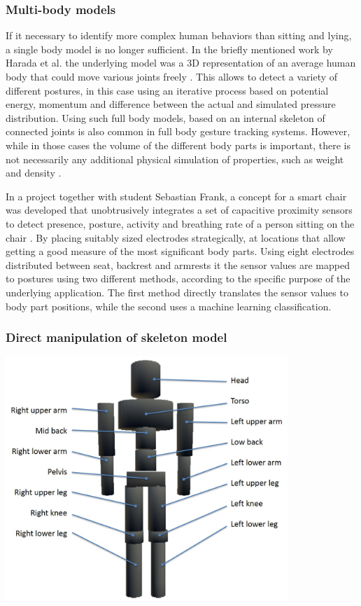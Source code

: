 \subsubsection{Multi-body models}
If it necessary to identify more complex human behaviors than sitting and lying, a single body model is no longer sufficient. In the briefly mentioned work by Harada et al. the underlying model was a 3D representation of an average human body that could move various joints freely \cite{harada2000human}. This allows to detect a variety of different postures, in this case using an iterative process based on potential energy, momentum and difference between the actual and simulated pressure distribution. Using such full body models, based on an internal skeleton of connected joints is also common in full body gesture tracking systems. However, while in those cases the volume of the different body parts is important, there is not necessarily any additional physical simulation of properties, such as weight and density \cite{Shotton2013}. 

In a project together with student Sebastian Frank, a concept for a smart chair was developed that unobtrusively integrates a set of capacitive proximity sensors to detect presence, posture, activity and breathing rate of a person sitting on the chair \cite{Braun2013ChairAid}. By placing suitably sized electrodes strategically, at locations that allow getting a good measure of the most significant body parts. Using eight electrodes distributed between seat, backrest and armrests it the sensor values are mapped to postures using two different methods, according to the specific purpose of the underlying application. The first method directly translates the sensor values to body part positions, while the second uses a machine learning classification.

\subsubsection*{Direct manipulation of skeleton model}
\begin{minipage}{\linewidth}
\centering
\includegraphics[width=0.8\textwidth]{images/smartchair_skeleton_model}
\label{fig:smartchair_skeleton_model}
\end{minipage}

